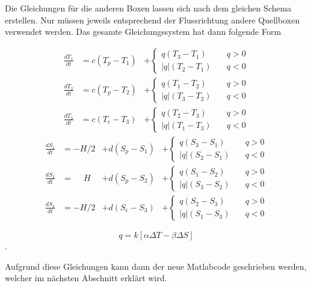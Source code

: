 Die Gleichungen für die anderen Boxen lassen sich nach dem gleichen Schema erstellen. Nur müssen jeweils entsprechend der Flussrichtung andere Quellboxen verwendet werden. Das gesamte Gleichungssystem hat dann folgende Form

\begin{equation}
\begin{aligned}
\frac{dT_1}{dt} &= c(T_p-T_1)&+ \begin{cases} q(T_3-T_1) & \quad q>0 \\ |q|(T_2-T_1) & \quad q<0 \end{cases}
\\
\frac{dT_2}{dt} &= c(T_p-T_2)&+\begin{cases} q(T_1-T_2) & \quad q>0 \\ |q|(T_3-T_2) & \quad q<0 \end{cases}
\\
\frac{dT_3}{dt} &= c(T_e-T_3)&+\begin{cases} q(T_2-T_3) & \quad q>0 \\ |q|(T_1-T_3) & \quad q<0 \end{cases}
\end{aligned}
\end{equation}
\begin{equation}
\begin{aligned}
\frac{dS_1}{dt} &= -H/2 &+ d(S_p-S_1)&+\begin{cases} q(S_3-S_1) & \quad q>0 \\ |q|(S_2-S_1) & \quad q<0 \end{cases}
\\
\frac{dS_2}{dt} &= \phantom{-}H &+ d(S_p-S_2)&+\begin{cases} q(S_1-S_2) & \quad q>0 \\ |q|(S_3-S_2) & \quad q<0 \end{cases}	
\\
\frac{dS_3}{dt} &= -H/2 &+d(S_e-S_3)&+\begin{cases} q(S_2-S_3) & \quad q>0 \\ |q|(S_1-S_3) & \quad q<0 \end{cases}
\end{aligned}
\end{equation}

\begin{equation}
q = k[\alpha\Delta T-\beta\Delta S] 
\end{equation}.



Aufgrund diese Gleichungen kann dann der neue Matlabcode geschrieben werden, welcher im nächsten Abschnitt erklärt wird.



